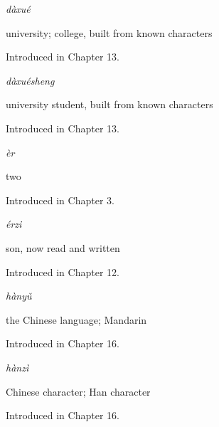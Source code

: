 \noindent\begin{minipage}[t]{\linewidth}
\raggedright
\textbf{}\enspace\emph{dàxué}\par
\small university; college, built from known characters\par
\footnotesize Introduced in Chapter 13.
\end{minipage}\par\medskip

\noindent\begin{minipage}[t]{\linewidth}
\raggedright
\textbf{}\enspace\emph{dàxuésheng}\par
\small university student, built from known characters\par
\footnotesize Introduced in Chapter 13.
\end{minipage}\par\medskip

\noindent\begin{minipage}[t]{\linewidth}
\raggedright
\textbf{}\enspace\emph{èr}\par
\small two\par
\footnotesize Introduced in Chapter 3.
\end{minipage}\par\medskip

\noindent\begin{minipage}[t]{\linewidth}
\raggedright
\textbf{}\enspace\emph{érzi}\par
\small son, now read and written\par
\footnotesize Introduced in Chapter 12.
\end{minipage}\par\medskip

\noindent\begin{minipage}[t]{\linewidth}
\raggedright
\textbf{}\enspace\emph{hànyǔ}\par
\small the Chinese language; Mandarin\par
\footnotesize Introduced in Chapter 16.
\end{minipage}\par\medskip

\noindent\begin{minipage}[t]{\linewidth}
\raggedright
\textbf{}\enspace\emph{hànzì}\par
\small Chinese character; Han character\par
\footnotesize Introduced in Chapter 16.
\end{minipage}\par\medskip

